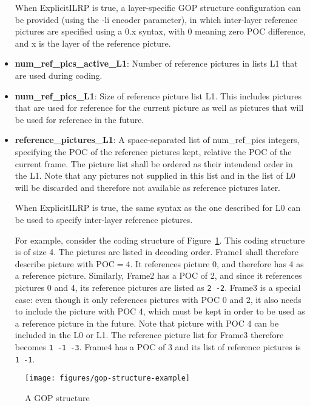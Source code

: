 \documentclass[a4paper,11pt]{jvetdoc}
\begin{document}
\begin{itemize}
When ExplicitILRP is true, a layer-specific GOP structure configuration can be provided (using the -li encoder
parameter), in which inter-layer reference pictures are specified using a 0.x syntax, with 0 meaning
zero POC difference, and x is the layer of the reference picture.

\item[]\textbf{num_ref_pics_active_L1}: Number of reference pictures in lists L1
that are used during coding.

\item[]\textbf{num_ref_pics_L1}: Size of reference picture list L1.
This includes pictures that are used for reference for the
current picture as well as pictures that will be used for reference in
the future.

\item[]\textbf{reference_pictures_L1}: A space-separated list of
num_ref_pics integers, specifying the POC of the reference pictures
kept, relative the POC of the current frame. The picture list shall be
ordered as their intendend order in the L1.
Note that any pictures not supplied in this list and in the list of L0 will be discarded and
therefore not available as reference pictures later.

When ExplicitILRP is true, the same syntax as the one described for L0 can be used to specify
inter-layer reference pictures.


For example, consider the coding structure of Figure~\ref{fig:gop-example}.
This coding structure is of size 4. The pictures are listed in decoding
order. Frame1 shall therefore describe picture with $\textrm{POC}=4$. It
references picture 0, and therefore has 4 as a reference picture.
Similarly, Frame2 has a POC of 2, and since it references pictures 0 and
4, its reference pictures are listed as \verb|2 -2|. Frame3 is a special
case: even though it only references pictures with POC 0 and 2, it also
needs to include the picture with POC 4, which must be kept in order to
be used as a reference picture in the future. Note that picture with POC 4 can be
included in the L0 or L1. The reference picture list for Frame3 therefore becomes \verb|1 -1 -3|. 
Frame4 has a POC of 3 and its list of reference pictures is \verb|1 -1|.
\end{itemize}

\begin{figure}[h]
\caption{A GOP structure}
\label{fig:gop-example}
\centering
\texttt{[image: figures/gop-structure-example]}
\end{figure}
\end{document}
